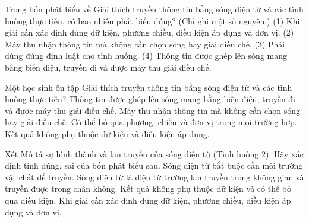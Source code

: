 \begin{ex}
Trong bốn phát biểu về Giải thích truyền thông tin bằng sóng điện từ và các tình huống thực tiễn, có bao nhiêu phát biểu đúng? (Chỉ ghi một số nguyên.) (1) Khi giải cần xác định đúng dữ kiện, phương chiều, điều kiện áp dụng và đơn vị. (2) Máy thu nhận thông tin mà không cần chọn sóng hay giải điều chế. (3) Phải dùng đúng định luật cho tình huống. (4) Thông tin được ghép lên sóng mang bằng biến điệu, truyền đi và được máy thu giải điều chế.
\end{ex}

\begin{ex}
Một học sinh ôn tập Giải thích truyền thông tin bằng sóng điện từ và các tình huống thực tiễn?
\choice
{\True Thông tin được ghép lên sóng mang bằng biến điệu, truyền đi và được máy thu giải điều chế.}
{Máy thu nhận thông tin mà không cần chọn sóng hay giải điều chế.}
{Có thể bỏ qua phương, chiều và đơn vị trong mọi trường hợp.}
{Kết quả không phụ thuộc dữ kiện và điều kiện áp dụng.}
\end{ex}

\begin{ex}
Xét Mô tả sự hình thành và lan truyền của sóng điện từ (Tình huống 2). Hãy xác định tính đúng, sai của bốn phát biểu sau.
\choiceTF
{Sóng điện từ bắt buộc cần môi trường vật chất để truyền.}
{\True Sóng điện từ là điện từ trường lan truyền trong không gian và truyền được trong chân không.}
{Kết quả không phụ thuộc dữ kiện và có thể bỏ qua điều kiện.}
{\True Khi giải cần xác định đúng dữ kiện, phương chiều, điều kiện áp dụng và đơn vị.}
\end{ex}

